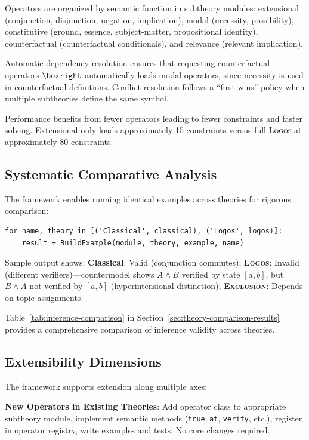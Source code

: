 \documentclass[pdflatex,sn-mathphys-num]{sn-jnl}
\newcommand{\theorylogos}{\textsc{Logos}}
\newcommand{\theoryexclusion}{\textsc{Exclusion}}
\newcommand{\zverify}{\texttt{verify}}
\newcommand{\ztrueat}{\texttt{true\_at}}
\theoremstyle{thmstyleone}
\theoremstyle{thmstyletwo}
\theoremstyle{thmstylethree}
\begin{document}
Operators are organized by semantic function in subtheory modules: extensional (conjunction, disjunction, negation, implication), modal (necessity, possibility), constitutive (ground, essence, subject-matter, propositional identity), counterfactual (counterfactual conditionals), and relevance (relevant implication).

Automatic dependency resolution ensures that requesting counterfactual operators $\boxright$ automatically loads modal operators, since necessity is used in counterfactual definitions.
Conflict resolution follows a ``first wins'' policy when multiple subtheories define the same symbol.

Performance benefits from fewer operators leading to fewer constraints and faster solving.
Extensional-only loads approximately 15 constraints versus full \theorylogos{} at approximately 80 constraints.

\subsection{Systematic Comparative Analysis}\label{sec:comparison}

The framework enables running identical examples across theories for rigorous comparison:

\begin{lstlisting}[caption={Multi-theory comparison}]
for name, theory in [('Classical', classical), ('Logos', logos)]:
    result = BuildExample(module, theory, example, name)
\end{lstlisting}

Sample output shows: \textbf{Classical}: Valid (conjunction commutes); \textbf{\theorylogos{}}: Invalid (different verifiers)---countermodel shows $A \land B$ verified by state $[a, b]$, but $B \land A$ not verified by $[a, b]$ (hyperintensional distinction); \textbf{\theoryexclusion{}}: Depends on topic assignments.

Table~\ref{tab:inference-comparison} in Section~\ref{sec:theory-comparison-results} provides a comprehensive comparison of inference validity across theories.

\subsection{Extensibility Dimensions}\label{sec:extensibility}

The framework supports extension along multiple axes:

\textbf{New Operators in Existing Theories}: Add operator class to appropriate subtheory module, implement semantic methods (\ztrueat{}, \zverify{}, etc.), register in operator registry, write examples and tests.
No core changes required.
\end{document}

